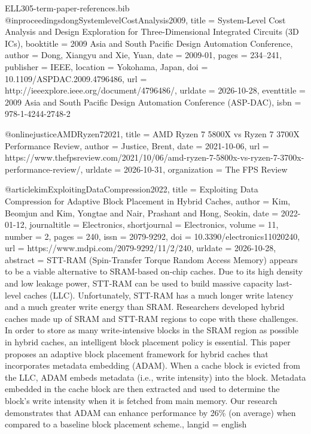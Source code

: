 \begin{filecontents*}[overwrite]{ELL305-term-paper-references.bib}
@inproceedings{dongSystemlevelCostAnalysis2009,
  title = {System-Level Cost Analysis and Design Exploration for Three-Dimensional Integrated Circuits ({{3D ICs}})},
  booktitle = {2009 {{Asia}} and {{South Pacific Design Automation Conference}}},
  author = {Dong, Xiangyu and Xie, Yuan},
  date = {2009-01},
  pages = {234--241},
  publisher = {IEEE},
  location = {Yokohama, Japan},
  doi = {10.1109/ASPDAC.2009.4796486},
  url = {http://ieeexplore.ieee.org/document/4796486/},
  urldate = {2026-10-28},
  eventtitle = {2009 {{Asia}} and {{South Pacific Design Automation Conference}} ({{ASP-DAC}})},
  isbn = {978-1-4244-2748-2}
}

@online{justiceAMDRyzen72021,
  title = {{{AMD Ryzen}} 7 {{5800X}} vs {{Ryzen}} 7 {{3700X Performance Review}}},
  author = {Justice, Brent},
  date = {2021-10-06},
  url = {https://www.thefpsreview.com/2021/10/06/amd-ryzen-7-5800x-vs-ryzen-7-3700x-performance-review/},
  urldate = {2026-10-31},
  organization = {The FPS Review}
}

@article{kimExploitingDataCompression2022,
  title = {Exploiting {{Data Compression}} for {{Adaptive Block Placement}} in {{Hybrid Caches}}},
  author = {Kim, Beomjun and Kim, Yongtae and Nair, Prashant and Hong, Seokin},
  date = {2022-01-12},
  journaltitle = {Electronics},
  shortjournal = {Electronics},
  volume = {11},
  number = {2},
  pages = {240},
  issn = {2079-9292},
  doi = {10.3390/electronics11020240},
  url = {https://www.mdpi.com/2079-9292/11/2/240},
  urldate = {2026-10-28},
  abstract = {STT-RAM (Spin-Transfer Torque Random Access Memory) appears to be a viable alternative to SRAM-based on-chip caches. Due to its high density and low leakage power, STT-RAM can be used to build massive capacity last-level caches (LLC). Unfortunately, STT-RAM has a much longer write latency and a much greater write energy than SRAM. Researchers developed hybrid caches made up of SRAM and STT-RAM regions to cope with these challenges. In order to store as many write-intensive blocks in the SRAM region as possible in hybrid caches, an intelligent block placement policy is essential. This paper proposes an adaptive block placement framework for hybrid caches that incorporates metadata embedding (ADAM). When a cache block is evicted from the LLC, ADAM embeds metadata (i.e., write intensity) into the block. Metadata embedded in the cache block are then extracted and used to determine the block’s write intensity when it is fetched from main memory. Our research demonstrates that ADAM can enhance performance by 26\% (on average) when compared to a baseline block placement scheme.},
  langid = {english}
}


\end{filecontents*}
